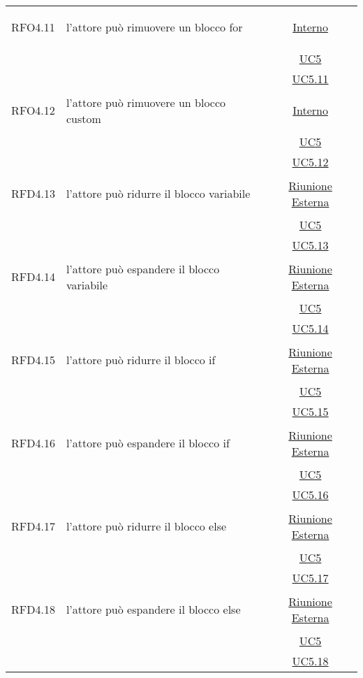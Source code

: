 \begin{longtable}{|c|>{\centering}m{7cm}|c|}
\hypertarget{RFO4.11}{RFO4.11} & l'attore può rimuovere un blocco for & \hyperlink{Interno}{Interno}\\
& &\hyperref[UC5]{UC5}\\
& &\hyperref[UC5.11]{UC5.11}\\ \hline

\hypertarget{RFO4.12}{RFO4.12} & l'attore può rimuovere un blocco custom & \hyperlink{Interno}{Interno}\\
& &\hyperref[UC5]{UC5}\\
& &\hyperref[UC5.12]{UC5.12}\\ \hline

\hypertarget{RFD4.13}{RFD4.13} & l'attore può ridurre il blocco variabile & \hyperlink{Riunione Esterna}{Riunione Esterna}\\
& &\hyperref[UC5]{UC5}\\
& &\hyperref[UC5.13]{UC5.13}\\ \hline

\hypertarget{RFD4.14}{RFD4.14} & l'attore può espandere il blocco variabile & \hyperlink{Riunione Esterna}{Riunione Esterna}\\
& &\hyperref[UC5]{UC5}\\
& &\hyperref[UC5.14]{UC5.14}\\ \hline

\hypertarget{RFD4.15}{RFD4.15} & l'attore può ridurre il blocco if & \hyperlink{Riunione Esterna}{Riunione Esterna}\\
& &\hyperref[UC5]{UC5}\\
& &\hyperref[UC5.15]{UC5.15}\\ \hline

\hypertarget{RFD4.16}{RFD4.16} & l'attore può espandere il blocco if & \hyperlink{Riunione Esterna}{Riunione Esterna}\\
& &\hyperref[UC5]{UC5}\\
& &\hyperref[UC5.16]{UC5.16}\\ \hline

\hypertarget{RFD4.17}{RFD4.17} & l'attore può ridurre il blocco else & \hyperlink{Riunione Esterna}{Riunione Esterna}\\
& &\hyperref[UC5]{UC5}\\
& & \hyperref[UC5.17]{UC5.17}\\ \hline

\hypertarget{RFD4.18}{RFD4.18} & l'attore può espandere il blocco else &  \hyperlink{Riunione Esterna}{Riunione Esterna}\\
& &\hyperref[UC5]{UC5}\\
& &\hyperref[UC5.18]{UC5.18}\\ \hline


\end{longtable}
